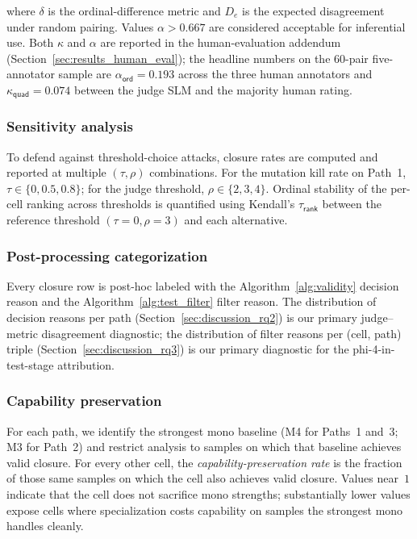 where $\delta$ is the ordinal-difference metric and $D_e$ is the expected disagreement under random pairing. Values $\alpha > 0.667$ are considered acceptable for inferential use. Both $\kappa$ and $\alpha$ are reported in the human-evaluation addendum (Section~\ref{sec:results_human_eval}); the headline numbers on the 60-pair five-annotator sample are $\alpha_{\textsf{ord}} = 0.193$ across the three human annotators and $\kappa_{\textsf{quad}} = 0.074$ between the judge SLM and the majority human rating.

\subsubsection{Sensitivity analysis}
\label{sec:experiment_setup_sensitivity}

To defend against threshold-choice attacks, closure rates are computed and reported at multiple $(\tau, \rho)$ combinations. For the mutation kill rate on Path~1, $\tau \in \{0, 0.5, 0.8\}$; for the judge threshold, $\rho \in \{2, 3, 4\}$. Ordinal stability of the per-cell ranking across thresholds is quantified using Kendall's $\tau_{\textsf{rank}}$ between the reference threshold $(\tau=0, \rho=3)$ and each alternative.

\subsubsection{Post-processing categorization}
\label{sec:experiment_setup_postproc}

Every closure row is post-hoc labeled with the Algorithm~\ref{alg:validity} decision reason and the Algorithm~\ref{alg:test_filter} filter reason. The distribution of decision reasons per path (Section~\ref{sec:discussion_rq2}) is our primary judge--metric disagreement diagnostic; the distribution of filter reasons per (cell, path) triple (Section~\ref{sec:discussion_rq3}) is our primary diagnostic for the phi-4-in-test-stage attribution.

\subsubsection{Capability preservation}
\label{sec:experiment_setup_capability}

For each path, we identify the strongest mono baseline (M4 for Paths~1 and~3; M3 for Path~2) and restrict analysis to samples on which that baseline achieves valid closure. For every other cell, the \emph{capability-preservation rate} is the fraction of those same samples on which the cell also achieves valid closure. Values near~$1$ indicate that the cell does not sacrifice mono strengths; substantially lower values expose cells where specialization costs capability on samples the strongest mono handles cleanly.


